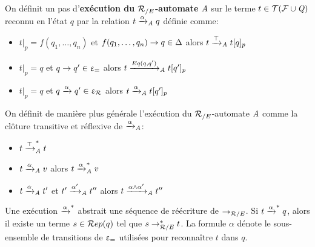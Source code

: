 
\begin{definition}
  \label{def:xrw_alpha}
  On définit un pas d'\textbf{exécution du ${\mathcal R_{/E}}$-automate} $\mathit A$ sur le terme $t \in \mathcal{ T(F \cup \mathit Q)}$ reconnu en l'état $q$ 
  par la relation $t \xrightarrow{\alpha}_\mathit A q$ définie comme:
  \begin{itemize}
  \item $t|_p = f(q_1, \dots, q_n)$ et $f(q_1, \dots, q_n) \rightarrow q \in \Delta$
    alors $t \xrightarrow{\top}_\mathit A t[q]_p$
  \item $t|_p = q$ et $q \rightarrow q' \in \upvarepsilon_{=}$ alors $t \xrightarrow{Eq(q, q')}_\mathit A t[q']_p$
  \item $t|_p = q$ et $q \xrightarrow{\alpha} q' \in \upvarepsilon_{\mathcal R}$ alors $t \xrightarrow{\alpha}_\mathit A t[q']_p$ 
  \end{itemize}
  On définit de manière plus générale l'exécution du ${\mathcal R_{/E}}$-automate $\mathit A$ comme la clôture 
  transitive et réflexive de $\xrightarrow{\alpha}_\mathit A$:
  \begin{itemize}
  \item $t \xrightarrow{\top}_\mathit A^* t$
  \item $t \xrightarrow{\alpha}_\mathit A v$ alors $t \xrightarrow{\alpha}^*_\mathit A v$
  \item $t \xrightarrow{\alpha}_\mathit A t'$ et  $t' \xrightarrow{\alpha'}_\mathit A t''$ alors $t \xrightarrow{\alpha \land \alpha'}_\mathit A t''$
  \end{itemize}
\end{definition}

\noindent
Une exécution $\xrightarrow{\alpha}^*$ abstrait une séquence de réécriture de $\rightarrow_{\mathcal R/E}$. Si $t
\xrightarrow{\alpha}^* q$, alors il existe un terme $s\in \mathcal R ep(q)$ tel que 
$s\rightarrow_{\mathcal R/E}^* t$. La formule $\alpha$ dénote le sous-ensemble de transitions de $\upvarepsilon_{=}$ 
utilisées pour reconnaître $t$ dans $q$.


